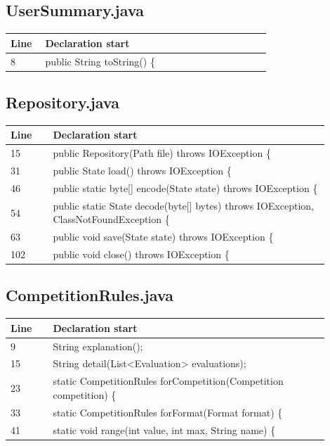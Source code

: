 \small
\subsection*{UserSummary.java}
\begin{longtable}{p{0.12\linewidth}p{0.78\linewidth}}\toprule Line & Declaration start\\\midrule\endhead
8 & public String toString() \{\\
\bottomrule\end{longtable}
\subsection*{Repository.java}
\begin{longtable}{p{0.12\linewidth}p{0.78\linewidth}}\toprule Line & Declaration start\\\midrule\endhead
15 & public Repository(Path file) throws IOException \{\\
31 & public State load() throws IOException \{\\
46 & public static byte[] encode(State state) throws IOException \{\\
54 & public static State decode(byte[] bytes) throws IOException, ClassNotFoundException \{\\
63 & public void save(State state) throws IOException \{\\
102 & public void close() throws IOException \{\\
\bottomrule\end{longtable}
\subsection*{CompetitionRules.java}
\begin{longtable}{p{0.12\linewidth}p{0.78\linewidth}}\toprule Line & Declaration start\\\midrule\endhead
9 & String explanation();\\
15 & String detail(List<Evaluation> evaluations);\\
23 & static CompetitionRules forCompetition(Competition competition) \{\\
33 & static CompetitionRules forFormat(Format format) \{\\
41 & static void range(int value, int max, String name) \{\\
\bottomrule\end{longtable}
